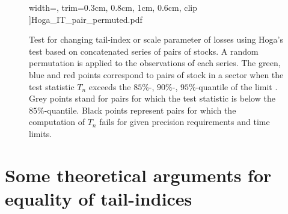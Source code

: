 \begin{figure}[htb!]
\begin{minipage}{0.33\linewidth}
      width=\textwidth,
      trim={0.3cm, 0.8cm, 1cm, 0.6cm}, clip
    ]{Hoga_IT_pair_permuted.pdf}
  \end{minipage}
  \caption{
    Test for changing tail-index or scale parameter
    of losses
    using Hoga's test based on concatenated series of pairs of
    stocks.
    A random permutation is applied to the observations of each
    series.
    The green, blue and red points
    correspond to pairs of stock in a sector 
    when the test statistic $T_n$ exceeds the $85\%$-, $90\%$-,
    $95\%$-quantile of the limit \ds .
    Grey points stand for pairs for which the test statistic is below
    the \asy\ $85\%$-quantile. Black points represent 
    pairs for which the computation of $T_n$ fails for given precision  
    requirements and time limits.
  }
  \label{fig:PairTest:permuted} 
\end{figure}


\newpage
\section{Some theoretical arguments for equality of tail-indices}\setcounter{equation}{0}\label{sec:2}
